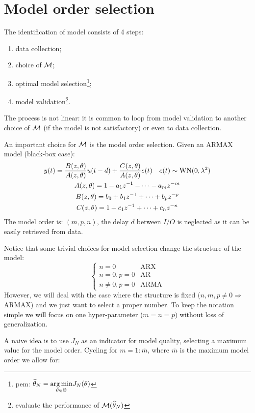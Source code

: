 \section{Model order selection}

The identification of model consists of 4 steps:
\begin{enumerate}
\item data collection;
\item choice of $ \mathcal{M}$;
\item optimal model selection\footnote{\gls{pem}: $ \widehat{\theta }_{N} =\underset{\theta \in \Theta }{\operatorname*{arg\,min}} J_{N}(\theta)$};
\item model validation\footnote{evaluate the performance of $\mathcal{M}(\widehat{\theta }_{N})$}.
\end{enumerate}

The process is not linear: it is common to loop from model validation to another choice of $ \mathcal{M}$ (if the model is not satisfactory) or even to data collection.

An important choice for $ \mathcal{M}$ is the model order selection. Given an ARMAX model (black-box case):
\begin{gather*}
y(t)=\frac{B(z,\theta)}{A(z,\theta)} u(t-d) +\frac{C(z,\theta)}{A(z,\theta)} e(t) \quad e(t) \sim \operatorname{WN} (0,\lambda ^{2})\\
A(z,\theta) =1-a_{1} z^{-1} -\cdots -a_{m} z^{-m} \\
B(z,\theta)=b_{0} +b_{1} z^{-1} +\cdots +b_{p} z^{-p}\\
C(z,\theta)=1+c_{1} z^{-1} +\cdots +c_{n} z^{-n}
\end{gather*}
The model order is: $ (m,p,n)$, the delay $ d$ between $ I/O$ is neglected as it can be easily retrieved from data.

Notice that some trivial choices for model selection change the structure of the model:
\begin{equation*}
\begin{cases}
n=0 & \text{ARX}\\
n=0,p=0 & \text{AR}\\
n\neq 0,p=0 & \text{ARMA}
\end{cases}
\end{equation*}
However, we will deal with the case where the structure is fixed ($ n,m,p\neq 0\Longrightarrow$ ARMAX) and we just want to select a proper number. To keep the notation simple we will focus on one hyper-parameter ($ m=n=p$) without loss of generalization.

A naive idea is to use $ J_{N}$ as an indicator for model quality, selecting a maximum value for the model order. Cycling for $ m=1:\overline{m}$, where $\overline{m}$ is the maximum model order we allow for:

